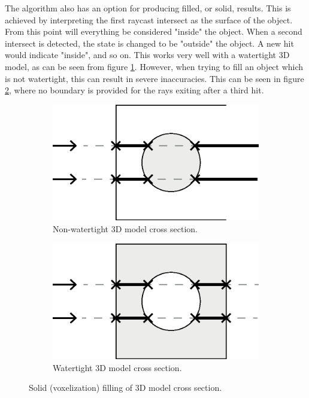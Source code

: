 The algorithm also has an option for producing filled, or solid, results. This is achieved by interpreting the first raycast intersect as the surface of the object. From this point will everything be considered "inside" the object. When a second intersect is detected, the state is changed to be "outside" the object. A new hit would indicate "inside", and so on. This works very well with a watertight 3D model, as can be seen from figure \ref{fig:filling-non-watertight-model}. However, when trying to fill an object which is not watertight, this can result in severe inaccuracies. This can be seen in figure \ref{fig:filling-watertight-model}, where no boundary is provided for the rays exiting after a third hit.
\begin{figure}[h]
    \centering
    \begin{subfigure}[b]{0.45\textwidth}
        \centering
        \includegraphics[width=\textwidth]{sections/methodology/figures/solid-non-watertight}
        \caption{Non-watertight 3D model cross section.}
        \label{fig:filling-non-watertight-model}
    \end{subfigure}
    \hfill
    \begin{subfigure}[b]{0.45\textwidth}
        \centering
        \includegraphics[width=\textwidth]{sections/methodology/figures/solid-watertight}
        \caption{Watertight 3D model cross section.}
        \label{fig:filling-watertight-model}
    \end{subfigure}
       \caption{Solid (voxelization) filling of 3D model cross section.}
       \label{fig:filling-3d-model}
\end{figure}

